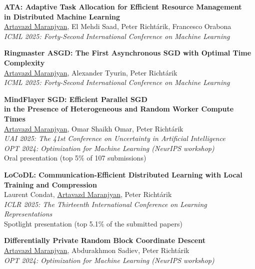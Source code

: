 \documentclass[11pt,a4paper,sans]{moderncv}        %
\newcommand{\red}{\color{cherry}}
\newcommand{\highlight}[1]{{\red #1}}
\begin{document}
\begin{etaremune}

\item \textbf{ATA: Adaptive Task Allocation for Efficient Resource Management \\ in Distributed Machine Learning}\\
\underline{Artavazd Maranjyan}, El Mehdi Saad, Peter Richtárik, Francesco Orabona\\
\textit{ICML 2025: Forty-Second International Conference on Machine Learning}

\item \textbf{Ringmaster ASGD: The First Asynchronous SGD with Optimal Time Complexity}\\
\underline{Artavazd Maranjyan}, Alexander Tyurin, Peter Richtárik\\
\textit{ICML 2025: Forty-Second International Conference on Machine Learning}

\item \textbf{MindFlayer SGD: Efficient Parallel SGD \\ in the Presence of Heterogeneous and Random Worker Compute Times}\\
\underline{Artavazd Maranjyan}, Omar Shaikh Omar, Peter Richtárik\\
\textit{UAI 2025: The 41st Conference on Uncertainty in Artificial Intelligence}\\
\textit{OPT 2024: Optimization for Machine Learning (NeurIPS workshop)}\\
\highlight{Oral presentation (top 5\% of 107 submissions)}

\item \textbf{LoCoDL: Communication-Efficient Distributed Learning with Local Training and Compression}\\
Laurent Condat, \underline{Artavazd Maranjyan}, Peter Richtárik\\
\textit{ICLR 2025: The Thirteenth International Conference on Learning Representations}\\
\highlight{Spotlight presentation (top 5.1\% of the submitted papers)}

\item \textbf{Differentially Private Random Block Coordinate Descent}\\
\underline{Artavazd Maranjyan}, Abdurakhmon Sadiev, Peter Richtárik\\
\textit{OPT 2024: Optimization for Machine Learning (NeurIPS workshop)}


\end{etaremune}
\end{document}
